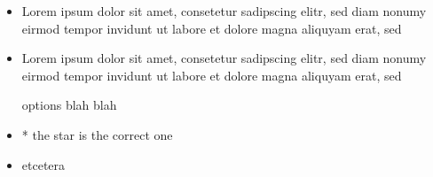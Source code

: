 \documentclass{article}
\begin{document}
\begin{itemize}
  \item Lorem ipsum dolor sit amet, consetetur sadipscing elitr, sed diam
  nonumy eirmod tempor invidunt ut labore et dolore magna aliquyam erat, sed
\item Lorem ipsum dolor sit amet, consetetur sadipscing elitr, sed diam
  nonumy eirmod tempor invidunt ut labore et dolore magna aliquyam erat, sed
\end{itemize}

  \begin{itemize}
    something here

    \item [options] blah blah
    \item * the star is the correct one
    \item etcetera
  \end{itemize}

  
\end{document}
